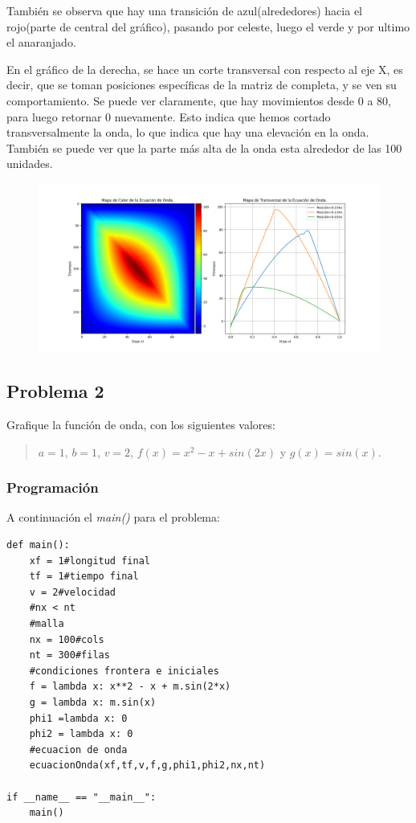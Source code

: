 \documentclass[a4paper,12pt]{article}
\newcommand{\eq}[1]{$#1$}
\begin{document}
    También se observa que hay una transición de azul(alrededores) 
    hacia el rojo(parte de central del gráfico), pasando por celeste, luego el verde 
    y por ultimo el anaranjado.

    En el gráfico de la derecha, se hace un corte transversal con respecto al eje X, es decir, que se toman
    posiciones específicas de la matriz de completa, y se ven su comportamiento.
    Se puede ver claramente, que hay movimientos desde 0 a 80, para luego retornar 0 nuevamente. Esto indica que hemos cortado
    transversalmente la onda, lo que indica que hay una elevación en la onda. También se puede ver que la parte
    más alta de la onda esta alrededor de las 100 unidades.

    \begin{figure}[t]
        \centering
        \includegraphics[width=\textwidth]{graph1.png}
    \end{figure}
    \newpage    
    \subsection{Problema 2}
    Grafique la función de onda, con los siguientes valores:
    \begin{quote}
        \centering
        \eq{a = 1}, \eq{b = 1}, \eq{v = 2}, \eq{f(x) = x^2 - x + sin(2x)} y \eq{g(x) = sin(x)}.
    \end{quote}
    \subsubsection{Programación}
    A continuación el \emph{main()} para el problema:

\begin{lstlisting}[frame=single]
def main():
    xf = 1#longitud final
    tf = 1#tiempo final
    v = 2#velocidad 
    #nx < nt
    #malla
    nx = 100#cols
    nt = 300#filas
    #condiciones frontera e iniciales
    f = lambda x: x**2 - x + m.sin(2*x)
    g = lambda x: m.sin(x)
    phi1 =lambda x: 0
    phi2 = lambda x: 0
    #ecuacion de onda
    ecuacionOnda(xf,tf,v,f,g,phi1,phi2,nx,nt)

if __name__ == "__main__":
    main()
\end{lstlisting}
\end{document}
